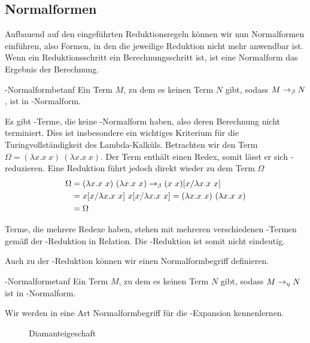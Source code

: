 \subsection{Normalformen}
\label{ssec:nf}
Aufbauend auf den eingeführten Reduktionsregeln können wir nun Normalformen einführen, also Formen, in den die jeweilige Reduktion nicht mehr anwendbar ist. Wenn ein Reduktionsschritt ein Berechnungsschritt ist, ist eine Normalform das Ergebnis der Berechnung.

\begin{definition}{\tbeta-Normalform}{betanf}
    Ein Term $M$, zu dem es keinen Term $N$ gibt, sodass $M\rightarrow_\beta N$, ist in \tbeta-Normalform.
\end{definition}

\begin{remark}
    Es gibt \tlambda-Terme, die keine \tbeta-Normalform haben, also deren Berechnung nicht terminiert. Dies ist insbesondere ein wichtiges Kriterium für die Turingvollständigkeit des Lambda-Kalküls. Betrachten wir den Term $\Omega = (\lambda x. x~x)~(\lambda x.x~x)$. Der Term enthält einen Redex, somit lässt er sich \tbeta-reduzieren. Eine Reduktion führt jedoch direkt wieder zu dem Term $\Omega$
    \begin{align*}
        \Omega&=(\lambda x.x~x)~(\lambda x.x~x)\rightarrow_\beta (x~x)[x/\lambda x.x~x] \\&= x[x/\lambda x.x~x]~x[x/\lambda x.x~x]=(\lambda x.x~x)~(\lambda x.x~x)\\&=\Omega
    \end{align*}    
\end{remark}
\begin{remark}
Terme, die mehrere Redexe haben, stehen mit mehreren verschiedenen \tlambda-Termen gemäß der \tbeta-Reduktion in Relation. Die \tbeta-Reduktion ist somit nicht eindeutig.
\end{remark}

Auch zu der \teta-Reduktion können wir einen Normalformbegriff definieren. 

\begin{definition}{\teta-Normalform}{etanf}
    Ein Term $M$, zu dem es keinen Term $N$ gibt, sodass $M\rightarrow_\eta N$ ist in \teta-Normalform.
\end{definition}

Wir werden in  eine Art Normalformbegriff für die \teta-Expansion kennenlernen.

\begin{figure}
    \center
    \caption{Diamanteigeschaft}
    \label{fig:diamond}    
\end{figure}

